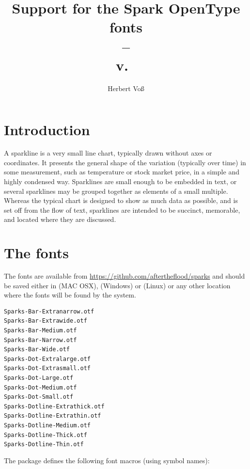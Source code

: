 \documentclass[fontsize=11pt,DIV=14,parskip=half-]{scrartcl}
\title{Support for the Spark OpenType fonts \\--\\ v.~\SparkVersion}
\author{Herbert Voß}
\begin{document}
\maketitle
\tableofcontents

\section{Introduction}

A sparkline is a very small line chart, typically drawn without axes or coordinates. 
It presents the general shape of the variation (typically over time) in some measurement, 
such as temperature or stock market price, in a simple and highly condensed way. 
Sparklines are small enough to be embedded in text, or several sparklines may be 
grouped together as elements of a small multiple. Whereas the typical chart is 
designed to show as much data as possible, and is set off from the flow of text, 
sparklines are intended to be succinct, memorable, and located where they are discussed.~\cite{wikipedia}


\section{The fonts}

The fonts are available from \url{https://github.com/aftertheflood/sparks} and should be saved
either in  (MAC OSX),  (Windows) or
 (Linux)  or any other location where
the fonts will be found by the system.

\begin{verbatim}
Sparks-Bar-Extranarrow.otf
Sparks-Bar-Extrawide.otf
Sparks-Bar-Medium.otf
Sparks-Bar-Narrow.otf
Sparks-Bar-Wide.otf
Sparks-Dot-Extralarge.otf
Sparks-Dot-Extrasmall.otf
Sparks-Dot-Large.otf
Sparks-Dot-Medium.otf
Sparks-Dot-Small.otf
Sparks-Dotline-Extrathick.otf
Sparks-Dotline-Extrathin.otf
Sparks-Dotline-Medium.otf
Sparks-Dotline-Thick.otf
Sparks-Dotline-Thin.otf
\end{verbatim}


The package defines the following font macros (using symbol names):
\end{document}
